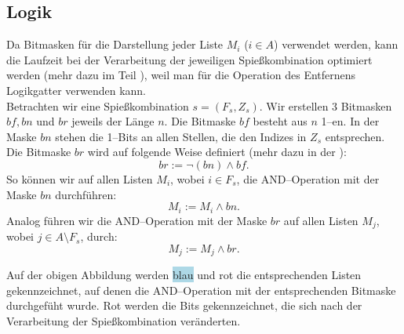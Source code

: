 \subsection{Logik}\label{sec:logik}
Da Bitmasken für die Darstellung jeder Liste $M_i$ ($i \in A$) verwendet werden, kann
die Laufzeit bei der Verarbeitung der jeweiligen Spießkombination optimiert werden
(mehr dazu im Teil ),
weil man für die Operation des Entfernens Logikgatter verwenden kann.\\

Betrachten wir eine Spießkombination $s = (F_s, Z_s)$.
Wir erstellen 3 Bitmasken $bf, bn$ und $br$ jeweils der Länge $n$.
Die Bitmaske $bf$ besteht aus $n$ 1--en.
In der Maske $bn$ stehen die 1--Bits an allen Stellen, die den Indizes in $Z_s$ entsprechen.
Die Bitmaske $br$ wird auf folgende Weise definiert (mehr dazu in der ):
\[
br := \neg(bn) \land bf.
\]
\noindent So können wir auf allen Listen $M_i$, wobei $i \in F_s$, die AND--Operation mit der Maske $bn$ 
durchführen:
\[
M_i := M_i \land bn.
\]
Analog führen wir die AND--Operation mit der Maske $br$ auf allen Listen $M_j$,
wobei $j \in A \setminus F_s$, durch:
\[
M_j := M_j \land br.
\]



Auf der obigen Abbildung werden \colorbox{lightblue}{blau} und \colorbox{lightred}{rot} die entsprechenden
Listen gekennzeichnet, auf denen die AND--Operation mit der entsprechenden Bitmaske durchgefüht wurde.
{\color{red} Rot} werden die Bits gekennzeichnet, die sich nach der Verarbeitung der Spießkombination veränderten.\\

